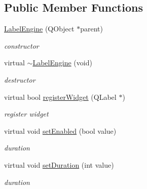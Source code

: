 \subsection*{Public Member Functions}
\begin{DoxyCompactItemize}
\item 
\mbox{\label{class_label_engine_a8715588c14c784e1d400f899c0ad3926}} 
\hyperlink{class_label_engine_a8715588c14c784e1d400f899c0ad3926}{Label\+Engine} (Q\+Object $\ast$parent)
\begin{DoxyCompactList}\small\item\em constructor \end{DoxyCompactList}\item 
\mbox{\label{class_label_engine_a64c1a4166fdb8a30e42b5532c69417f2}} 
virtual \hyperlink{class_label_engine_a64c1a4166fdb8a30e42b5532c69417f2}{$\sim$\+Label\+Engine} (void)
\begin{DoxyCompactList}\small\item\em destructor \end{DoxyCompactList}\item 
\mbox{\label{class_label_engine_af81840b596bd526c48c4b47704cc099e}} 
virtual bool \hyperlink{class_label_engine_af81840b596bd526c48c4b47704cc099e}{register\+Widget} (Q\+Label $\ast$)
\begin{DoxyCompactList}\small\item\em register widget \end{DoxyCompactList}\item 
\mbox{\label{class_label_engine_ae3248f2f4ab8373258d1bb8006de054c}} 
virtual void \hyperlink{class_label_engine_ae3248f2f4ab8373258d1bb8006de054c}{set\+Enabled} (bool value)
\begin{DoxyCompactList}\small\item\em duration \end{DoxyCompactList}\item 
\mbox{\label{class_label_engine_a67bec426ee18535b7ce807f2a39856d6}} 
virtual void \hyperlink{class_label_engine_a67bec426ee18535b7ce807f2a39856d6}{set\+Duration} (int value)
\begin{DoxyCompactList}\small\item\em duration \end{DoxyCompactList}\end{DoxyCompactItemize}
